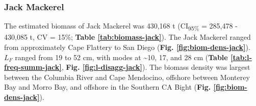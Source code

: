 \documentclass[]{article}
\begin{document}
\newpage

\hypertarget{results-jack}{%
\subsubsection{Jack Mackerel}\label{results-jack}}

The estimated biomass of Jack Mackerel was 430,168 t (CI\textsubscript{95\%} = 285,478 - 430,085 t, CV = 15\%; \textbf{Table \ref{tab:biomass-jack}}). The Jack Mackerel ranged from approximately Cape Flattery to San Diego (\textbf{Fig. \ref{fig:biom-dens-jack}}). \(L_F\) ranged from 19 to 52 cm, with modes at \textasciitilde10, 17, and 28 cm (\textbf{Table \ref{tab:l-freq-summ-jack}}, \textbf{Fig. \ref{fig:l-disagg-jack}}). The biomass density was largest between the Columbia River and Cape Mendocino, offshore between Monterey Bay and Morro Bay, and offshore in the Southern CA Bight (\textbf{Fig. \ref{fig:biom-dens-jack}}).



\begin{table}[!h]

\caption{\label{tab:biomass-jack}Biomass estimates (metric tons, t) and their precision (upper and lower 95\% confidence intervals, CI\textsubscript{95\%}; standard deviation, SD; and coefficient of variation, CV) for Jack Mackerel (\emph{Trachurus symmetricus}). Stratum areas are nmi\textsuperscript{2}.}
\centering
{}
\end{table}

\newpage
\end{document}

